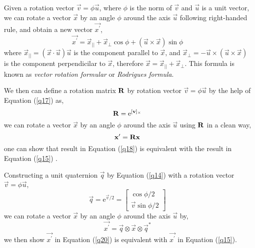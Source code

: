 Given a rotation vector $\vec{v} = \phi\vec{u}$, where $\phi$ is the norm of $\vec{v}$ and $\vec{u}$ is a unit vector, we can rotate a vector $\vec{x}$ by an angle $\phi$ around the axis $\vec{u}$ following right-handed rule, and obtain a new vector $\vec{x^{\prime}}$,
\begin{equation}\label{q15}
	\vec{x^{\prime}} = \vec{x}_{||} + \vec{x}_{\bot}\cos{\phi} + (\vec{u} \times \vec{x})\sin{\phi}
\end{equation}
where $\vec{x}_{||} = (\vec{x} \cdot \vec{u})\vec{u}$ is the component parallel to $\vec{x}$, and $\vec{x}_{\bot} = -\vec{u} \times (\vec{u} \times \vec{x})$ is the component perpendicilar to $\vec{x}$, therefore $\vec{x} = \vec{x}_{||} + \vec{x}_{\bot}$. This formula is known as \textit{vector rotation formular} or \textit{Rodrigues formula}.

We then can define a rotation matrix $\mathbf{R}$ by rotation vector $\vec{v} = \phi\vec{u}$ by the help of Equation (\ref{q17}) as,
\begin{equation}\label{q16}
	\mathbf{R} = \mathrm{e}^{[\mathbf{v}]_\times}
\end{equation}
we can rotate a vector $\vec{x}$ by an angle $\phi$ around the axis $\vec{u}$ using $\mathbf{R}$ in a clean way,
\begin{equation}\label{q18}
	\mathbf{x^{\prime}} = \mathbf{R}\mathbf{x}
\end{equation}
one can show that result in Equation (\ref{q18}) is equivalent with the result in Equation (\ref{q15}) \cite{wiki:rotationformula}. 

Constructing a unit quaternion $\vec{q}$ by Equation (\ref{q14}) with a rotation vector $\vec{v} = \phi\vec{u}$, 
\begin{equation}\label{q19}
	\vec{q} = \mathrm{e}^{\vec{v}/2} = \begin{bmatrix}
											\cos{\phi / 2}  \\ \vec{v}\sin{\phi / 2} 
									  \end{bmatrix}
\end{equation}
we can rotate a vector $\vec{x}$ by an angle $\phi$ around the axis $\vec{u}$ by,
\begin{equation}\label{q20}
	\vec{x^{\prime}} = \vec{q} \otimes \vec{x} \otimes \vec{q}^{*}
\end{equation}
we then show $\vec{x^{\prime}}$ in Equation (\ref{q20}) is equivalent with $\vec{x^{\prime}}$ in Equation (\ref{q15}).

